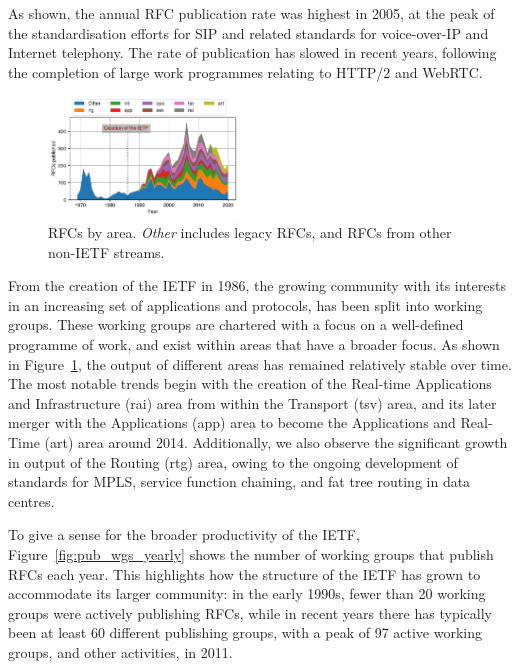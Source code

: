 \documentclass[twocolumn,10pt]{article}
\newcommand{\pb}[1]{\vspace{0.75ex}\noindent{\textbf{#1}}}
\begin{document}
As shown, the annual RFC publication rate was highest in 2005, at the peak
of the standardisation efforts for SIP and related standards for voice-over-IP
and Internet telephony. The rate of publication has slowed in recent years,
following the completion of large work programmes relating to HTTP/2 and
WebRTC.

\begin{figure}
\includegraphics[width=0.45\textwidth]{figures-prev/imc-2021/documents/rfcs_areas.pdf}
\caption{RFCs by area. \textit{Other} includes legacy RFCs, and RFCs from other non-IETF streams.}
\label{fig:rfcs_by_area}
\end{figure}


\pb{Role of Working Groups:}
From the creation of the IETF in 1986, the growing community with its
interests in an increasing set of applications and protocols, has been
split into working groups. These working groups are chartered with a focus
on a well-defined programme of work, and exist within areas that have a
broader focus.  As shown in Figure~\ref{fig:rfcs_by_area}, the output of
different areas has remained relatively stable over time. The most notable
trends begin with the creation of the Real-time Applications and
Infrastructure (rai) area from within the Transport (tsv) area, and its
later merger with the Applications (app) area to become the Applications
and Real-Time (art) area around 2014. Additionally, we also observe the
significant growth in output of the Routing (rtg) area, owing to the
ongoing development of standards for MPLS, service function chaining, and
fat tree routing in data centres.

To give a sense for the broader productivity of the IETF,
Figure~\ref{fig:pub_wgs_yearly} shows the number of working groups that
publish RFCs each year. This highlights how the structure of the IETF has
grown to accommodate its larger community: in the early 1990s, fewer than
20 working groups were actively publishing RFCs, while in recent years
there has typically been at least 60 different publishing groups, with a
peak of 97 active working groups, and other activities, in 2011.
\end{document}
